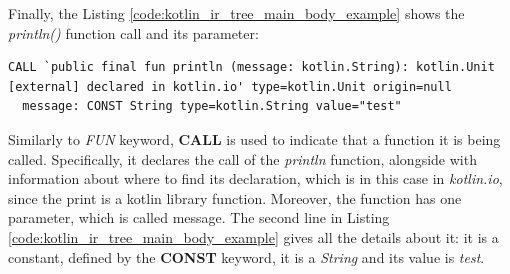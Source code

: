 Finally, the Listing \ref{code:kotlin_ir_tree_main_body_example} shows the \textit{println()} function call and its parameter:
\begin{lstlisting}[caption={Kotlin IR tree of the body block content of the main function in Listing \ref{code:kotlin_for_ir_tree}}, captionpos=b, label={code:kotlin_ir_tree_main_body_example}]
CALL `public final fun println (message: kotlin.String): kotlin.Unit [external] declared in kotlin.io' type=kotlin.Unit origin=null
  message: CONST String type=kotlin.String value="test"
\end{lstlisting}
Similarly to \textit{FUN} keyword, \textbf{CALL} is used to indicate that a function it is being called. Specifically, it declares the call of the \textit{println} function, alongside with information about where to find its declaration, which is in this case in \textit{kotlin.io}, since the print is a kotlin library function. Moreover, the function has one parameter, which is called message. The second line in Listing \ref{code:kotlin_ir_tree_main_body_example} gives all the details about it: it is a constant, defined by the \textbf{CONST} keyword, it is a \textit{String} and its value is \textit{test}.

